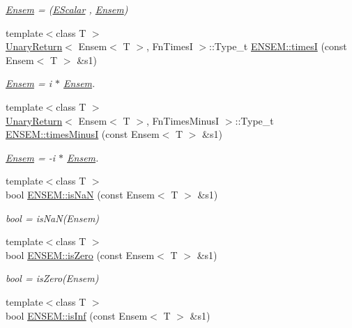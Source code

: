 \begin{DoxyCompactItemize}
\begin{DoxyCompactList}\small\item\em \mbox{\hyperlink{classENSEM_1_1Ensem}{Ensem}} = (\mbox{\hyperlink{classENSEM_1_1EScalar}{E\+Scalar}} , \mbox{\hyperlink{classENSEM_1_1Ensem}{Ensem}}) \end{DoxyCompactList}\item 
{\footnotesize template$<$class T $>$ }\\\mbox{\hyperlink{structUnaryReturn}{Unary\+Return}}$<$ Ensem$<$ T $>$, Fn\+TimesI $>$\+::Type\+\_\+t \mbox{\hyperlink{group__eensem_ga3fc5873019ba3366e2e3fd6cad8632bd}{E\+N\+S\+E\+M\+::timesI}} (const Ensem$<$ T $>$ \&s1)
\begin{DoxyCompactList}\small\item\em \mbox{\hyperlink{classENSEM_1_1Ensem}{Ensem}} = i $\ast$ \mbox{\hyperlink{classENSEM_1_1Ensem}{Ensem}}. \end{DoxyCompactList}\item 
{\footnotesize template$<$class T $>$ }\\\mbox{\hyperlink{structUnaryReturn}{Unary\+Return}}$<$ Ensem$<$ T $>$, Fn\+Times\+MinusI $>$\+::Type\+\_\+t \mbox{\hyperlink{group__eensem_ga405bf45509ebc2aed7e0bc4423e24849}{E\+N\+S\+E\+M\+::times\+MinusI}} (const Ensem$<$ T $>$ \&s1)
\begin{DoxyCompactList}\small\item\em \mbox{\hyperlink{classENSEM_1_1Ensem}{Ensem}} = -\/i $\ast$ \mbox{\hyperlink{classENSEM_1_1Ensem}{Ensem}}. \end{DoxyCompactList}\item 
{\footnotesize template$<$class T $>$ }\\bool \mbox{\hyperlink{group__eensem_ga2567a8b58f681cf59bfe43ccf72d2d54}{E\+N\+S\+E\+M\+::is\+NaN}} (const Ensem$<$ T $>$ \&s1)
\begin{DoxyCompactList}\small\item\em bool = is\+Na\+N(\+Ensem) \end{DoxyCompactList}\item 
{\footnotesize template$<$class T $>$ }\\bool \mbox{\hyperlink{group__eensem_gaa66b7f8af2e0f2f38b3a8387b5848c5b}{E\+N\+S\+E\+M\+::is\+Zero}} (const Ensem$<$ T $>$ \&s1)
\begin{DoxyCompactList}\small\item\em bool = is\+Zero(\+Ensem) \end{DoxyCompactList}\item 
{\footnotesize template$<$class T $>$ }\\bool \mbox{\hyperlink{group__eensem_gadb04ba05461a486afdf403c61b5bff34}{E\+N\+S\+E\+M\+::is\+Inf}} (const Ensem$<$ T $>$ \&s1)

\end{DoxyCompactItemize}
